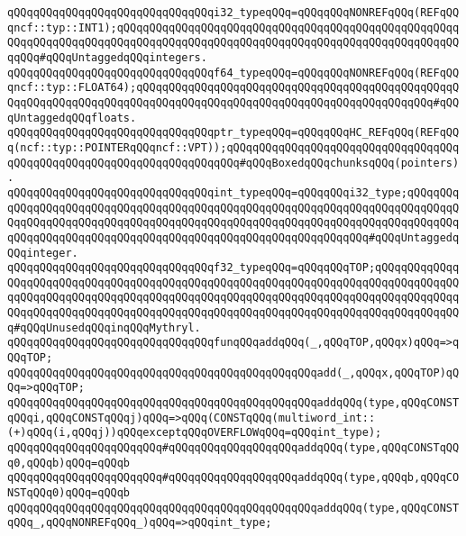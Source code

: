 \verb|qQQqqQQqqQQqqQQqqQQqqQQqqQQqqQQqi32_typeqQQq=qQQqqQQqNONREFqQQq(REFqQQqncf::typ::INT1);qQQqqQQqqQQqqQQqqQQqqQQqqQQqqQQqqQQqqQQqqQQqqQQqqQQqqQQqqQQqqQQqqQQqqQQqqQQqqQQqqQQqqQQqqQQqqQQqqQQqqQQqqQQqqQQqqQQqqQQqqQQqqQQq#qQQqUntaggedqQQqintegers.|\newline
\verb|qQQqqQQqqQQqqQQqqQQqqQQqqQQqqQQqf64_typeqQQq=qQQqqQQqNONREFqQQq(REFqQQqncf::typ::FLOAT64);qQQqqQQqqQQqqQQqqQQqqQQqqQQqqQQqqQQqqQQqqQQqqQQqqQQqqQQqqQQqqQQqqQQqqQQqqQQqqQQqqQQqqQQqqQQqqQQqqQQqqQQqqQQqqQQqqQQq#qQQqUntaggedqQQqfloats.|\newline
\newline
\verb|qQQqqQQqqQQqqQQqqQQqqQQqqQQqqQQqptr_typeqQQq=qQQqqQQqHC_REFqQQq(REFqQQq(ncf::typ::POINTERqQQqncf::VPT));qQQqqQQqqQQqqQQqqQQqqQQqqQQqqQQqqQQqqQQqqQQqqQQqqQQqqQQqqQQqqQQqqQQqqQQq#qQQqBoxedqQQqchunksqQQq(pointers).|\newline
\verb|qQQqqQQqqQQqqQQqqQQqqQQqqQQqqQQqint_typeqQQq=qQQqqQQqi32_type;qQQqqQQqqQQqqQQqqQQqqQQqqQQqqQQqqQQqqQQqqQQqqQQqqQQqqQQqqQQqqQQqqQQqqQQqqQQqqQQqqQQqqQQqqQQqqQQqqQQqqQQqqQQqqQQqqQQqqQQqqQQqqQQqqQQqqQQqqQQqqQQqqQQqqQQqqQQqqQQqqQQqqQQqqQQqqQQqqQQqqQQqqQQqqQQqqQQqqQQqqQQq#qQQqUntaggedqQQqinteger.|\newline
\verb|qQQqqQQqqQQqqQQqqQQqqQQqqQQqqQQqf32_typeqQQq=qQQqqQQqTOP;qQQqqQQqqQQqqQQqqQQqqQQqqQQqqQQqqQQqqQQqqQQqqQQqqQQqqQQqqQQqqQQqqQQqqQQqqQQqqQQqqQQqqQQqqQQqqQQqqQQqqQQqqQQqqQQqqQQqqQQqqQQqqQQqqQQqqQQqqQQqqQQqqQQqqQQqqQQqqQQqqQQqqQQqqQQqqQQqqQQqqQQqqQQqqQQqqQQqqQQqqQQqqQQqqQQqqQQqqQQqqQQq#qQQqUnusedqQQqinqQQqMythryl.|\newline
\newline
\verb|qQQqqQQqqQQqqQQqqQQqqQQqqQQqqQQqfunqQQqaddqQQq(_,qQQqTOP,qQQqx)qQQq=>qQQqTOP;|\newline
\verb|qQQqqQQqqQQqqQQqqQQqqQQqqQQqqQQqqQQqqQQqqQQqqQQqadd(_,qQQqx,qQQqTOP)qQQq=>qQQqTOP;|\newline
\verb|qQQqqQQqqQQqqQQqqQQqqQQqqQQqqQQqqQQqqQQqqQQqqQQqaddqQQq(type,qQQqCONSTqQQqi,qQQqCONSTqQQqj)qQQq=>qQQq(CONSTqQQq(multiword_int::(+)qQQq(i,qQQqj))qQQqexceptqQQqOVERFLOWqQQq=qQQqint_type);|\newline
\verb|qQQqqQQqqQQqqQQqqQQqqQQq#qQQqqQQqqQQqqQQqqQQqaddqQQq(type,qQQqCONSTqQQq0,qQQqb)qQQq=qQQqb|\newline
\verb|qQQqqQQqqQQqqQQqqQQqqQQq#qQQqqQQqqQQqqQQqqQQqaddqQQq(type,qQQqb,qQQqCONSTqQQq0)qQQq=qQQqb|\newline
\verb|qQQqqQQqqQQqqQQqqQQqqQQqqQQqqQQqqQQqqQQqqQQqqQQqaddqQQq(type,qQQqCONSTqQQq_,qQQqNONREFqQQq_)qQQq=>qQQqint_type;|\newline
